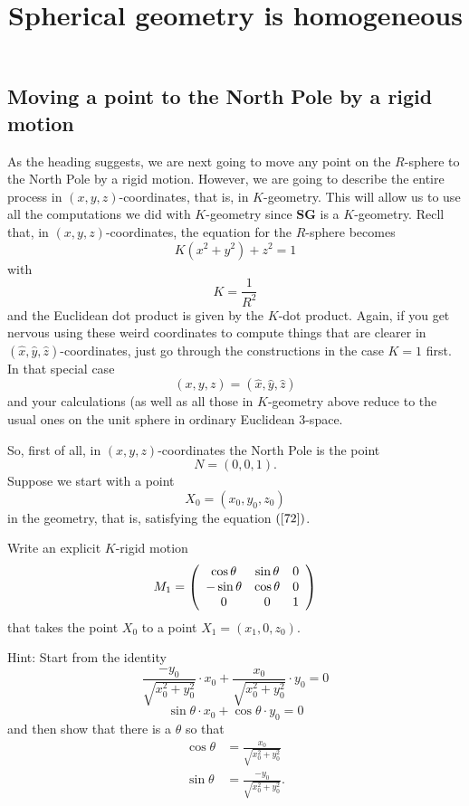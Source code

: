 \documentclass{ximera}
\title{Spherical geometry is homogeneous}
\begin{document}
\begin{abstract}

\end{abstract}
\maketitle



\subsection*{Moving a point to the North Pole by a rigid motion}

As the heading suggests, we are next going to move any point on the
$R$-sphere to the North Pole by a rigid motion. However, we are going
to describe the entire process in $\left( x,y,z\right) $-coordinates,
that is, in $K$-geometry. This will allow us to use all the
computations we did with $K$-geometry since \textbf{SG} is a
$K$-geometry.  Recll that, in $\left( x,y,z\right) $-coordinates, the
equation for the $R$-sphere becomes%
\begin{equation}
K\left(  x^{2}+y^{2}\right)  +z^{2}=1 \label{72}%
\end{equation}
with%
\[
K=\frac{1}{R^{2}}%
\]
and the Euclidean dot product is given by the $K$-dot product. Again, if you
get nervous using these weird coordinates to compute things that are clearer
in $\left(  \hat{x},\hat{y},\hat{z}\right)  $-coordinates, just go through the
constructions in the case $K=1$ first. In that special case
\[
\left(  x,y,z\right)  =\left(  \hat{x},\hat{y},\hat{z}\right)
\]
and your calculations (as well as all those in $K$-geometry above reduce to
the usual ones on the unit sphere in ordinary Euclidean $3$-space.

So, first of all, in $\left(  x,y,z\right)  $-coordinates the North Pole is
the point%
\[
N=\left(  0,0,1\right)  .
\]
Suppose we start with a point%
\[
X_{0}=\left(  x_{0},y_{0},z_{0}\right)
\]
in the geometry, that is, satisfying the equation $\left(  \ref{72}\right)  $.

\begin{exercise}
 Write an explicit $K$-rigid motion%
\[
M_{1}=\left(
\begin{array}
[c]{ccc}%
\cos\theta & \sin \theta & 0\\
-\sin \theta & \cos\theta & 0\\
0 & 0 & 1
\end{array}
\right)
\]
that takes the point $X_{0}$ to a point $X_{1}=\left(  x_{1},0,z_{0}\right)  $.

Hint: Start from the identity%
\[
\frac{-y_{0}}{\sqrt{x_{0}^{2}+y_{0}^{2}}}\cdot x_{0}%
+\frac{x_{0}}{\sqrt{x_{0}^{2}+y_{0}^{2}}}\cdot y_{0}=0
\]%
\[
\sin \theta\cdot x_{0}+\cos\theta
\cdot y_{0}=0
\]
and then show that there is a $\theta$ so that%
\begin{align*}
\cos\theta &  =\frac{x_{0}}{\sqrt{x_{0}^{2}+y_{0}^{2}}}\\
\sin \theta &  =\frac{-y_{0}}{\sqrt{x_{0}^{2}+y_{0}^{2}}}.
\end{align*}

\end{exercise}
\end{document}
